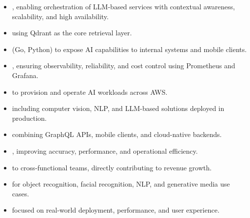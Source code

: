 

\begin{itemize}
  \item {}, enabling orchestration of LLM-based services with contextual awareness, scalability, and high availability.
  \item {} using Qdrant as the core retrieval layer.
  \item {} (Go, Python) to expose AI capabilities to internal systems and mobile clients.
  \item {}, ensuring observability, reliability, and cost control using Prometheus and Grafana.
  \item {} to provision and operate AI workloads across AWS.
\end{itemize}

\divider

\begin{itemize}
  \item {} including computer vision, NLP, and LLM-based solutions deployed in production.
  \item {} combining GraphQL APIs, mobile clients, and cloud-native backends.
  \item {}, improving accuracy, performance, and operational efficiency.
  \item {} to cross-functional teams, directly contributing to revenue growth.
\end{itemize}

\divider

\begin{itemize}
  \item {} for object recognition, facial recognition, NLP, and generative media use cases.
  \item {} focused on real-world deployment, performance, and user experience.
\end{itemize}

